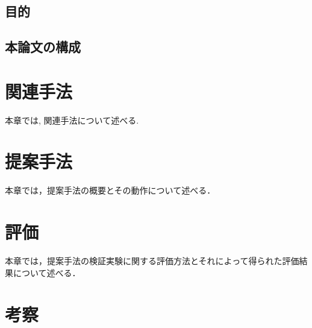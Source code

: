 \documentclass[a4paper,11pt]{ujreport}
\begin{document}
\section{目的}

\section{本論文の構成}

\chapter{関連手法}\label{chap:relative_method}

本章では, 関連手法について述べる.

\chapter{提案手法}\label{chap:prpposal}


本章では，提案手法の概要とその動作について述べる．

\chapter{評価}\label{chap:evaluation}

本章では，提案手法の検証実験に関する評価方法とそれによって得られた評価結果について述べる．

\chapter{考察}\label{chap:discussion}
\end{document}
